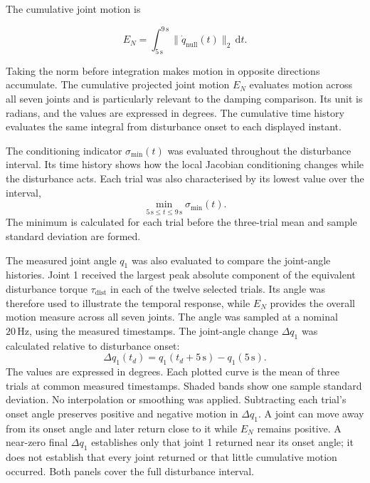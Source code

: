 The cumulative joint motion is

\begin{equation}
E_N
=
\int_{5\,\mathrm{s}}^{9\,\mathrm{s}}
\lVert\dot q_{\mathrm{null}}(t)\rVert_2\,\mathrm{d}t.
\label{eq:nullspace_excursion_metric}
\end{equation}

Taking the norm before integration makes motion in opposite directions
accumulate. The cumulative projected joint motion \(E_N\) evaluates motion
across all seven joints and is particularly relevant to the damping
comparison. Its unit is radians, and the values are expressed in degrees. The
cumulative time history evaluates the same integral from disturbance onset to
each displayed instant.

The conditioning indicator \(\sigma_{\min}(t)\) was evaluated throughout
the disturbance interval. Its time history shows how the local Jacobian
conditioning changes while the disturbance acts. Each trial was also
characterised by its lowest value over the interval,
\[
\min_{5\,\mathrm{s}\leq t\leq9\,\mathrm{s}}\sigma_{\min}(t).
\]
The minimum is calculated for each trial before the three-trial mean and
sample standard deviation are formed.

The measured joint angle \(q_1\) was also evaluated to compare the
joint-angle histories. Joint 1 received the largest peak absolute component of
the equivalent disturbance torque \(\tau_{\mathrm{dist}}\) in each of the
twelve selected trials. Its angle was therefore used to illustrate the
temporal response, while \(E_N\) provides the overall motion measure across all
seven joints. The angle was sampled at a nominal \(20\,\mathrm{Hz}\), using
the measured timestamps. The joint-angle change \(\Delta q_1\) was calculated
relative to disturbance onset:
\[
\Delta q_1(t_d)=q_1(t_d+5\,\mathrm{s})-q_1(5\,\mathrm{s}).
\]
The values are expressed in degrees. Each plotted curve is the mean of
three trials at common measured timestamps. Shaded bands show one sample
standard deviation. No interpolation or smoothing was applied.
Subtracting each trial's onset angle preserves positive and negative motion
in \(\Delta q_1\). A joint can move away from its onset angle and later return
close to it while \(E_N\) remains positive. A near-zero final \(\Delta q_1\)
establishes only that joint 1 returned near its onset angle; it does not
establish that every joint returned or that little cumulative motion occurred.
Both panels cover the full disturbance interval.
